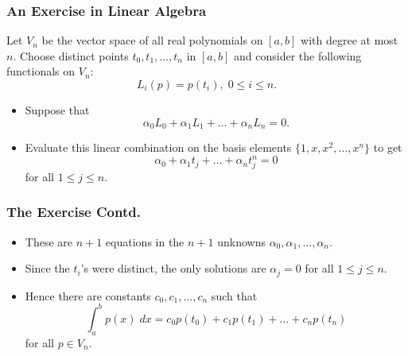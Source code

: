 \documentclass{beamer}
\begin{document}

\begin{frame}
  \frametitle{An Exercise in Linear Algebra}

Let $V_n$ be the vector space of all real polynomials on $[a, b]$ with degree at most $n$. 
Choose distinct points $t_0, t_1, \ldots, t_n$ in $[a, b]$ and consider the following functionals
on $V_n$:
\[
L_i(p) = p(t_i), \; 0 \le i \le n.
\]

  \begin{itemize}
  \item Suppose that
\[
\alpha_0 L_0 + \alpha_1 L_1 + \ldots + \alpha_n L_n = 0.
\]
  \item Evaluate this linear combination on the basis elements $\{1, x, x^2, \ldots, x^n\}$ to get 
\[
\alpha_0 + \alpha_1 t_j + \ldots + \alpha_n t_j^n = 0
\]  
for all $1 \le j \le n$.


  \end{itemize}
\end{frame}


\begin{frame}
  \frametitle{The Exercise Contd.}

  
\begin{itemize}
  \item These are $n + 1$ equations in the $n + 1$ unknowns $\alpha_0, \alpha_1, \ldots, \alpha_n$.
    
  \item Since the $t_i$'s were distinct, the only solutions are $\alpha_j = 0$ for all $ 1\le j \le n$.

  \item Hence there are constants $c_0, c_1, \ldots, c_n$ such that 
\[
\int_a^b p(x) \; dx = c_0 p(t_0) + c_1 p(t_1) + \ldots + c_n p(t_n)
\]
for all $p \in V_n$.

\end{itemize}

\end{frame}
\end{document}
